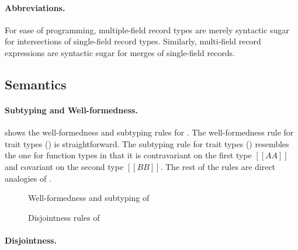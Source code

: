 \paragraph{Abbreviations.}
For ease of programming, multiple-field record types are merely syntactic sugar
for intersections of single-field record types. Similarly, multi-field record
expressions are syntactic sugar for merges of single-field records.

\subsection{Semantics}

\paragraph{Subtyping and Well-formedness.}

 shows the well-formedness and subtyping rules for
\sedel. The well-formedness rule for trait types () is straightforward. The
subtyping rule for trait types () resembles the one for function
types in that it is contravariant on the first type $[[AA]]$ and covariant on
the second type $[[BB]]$. The rest of the rules are direct analogies of \fnamee.

\begin{figure}[t]
  \centering
  \begin{small}
  \end{small}
  \caption{Well-formedness and subtyping of \sedel}
  \label{fig:trait:typesystem}
\end{figure}


\begin{figure}
  \centering
\caption{Disjointness rules of \sedel}
  \label{fig:disjoint:sedel}
\end{figure}


\paragraph{Disjointness.}

